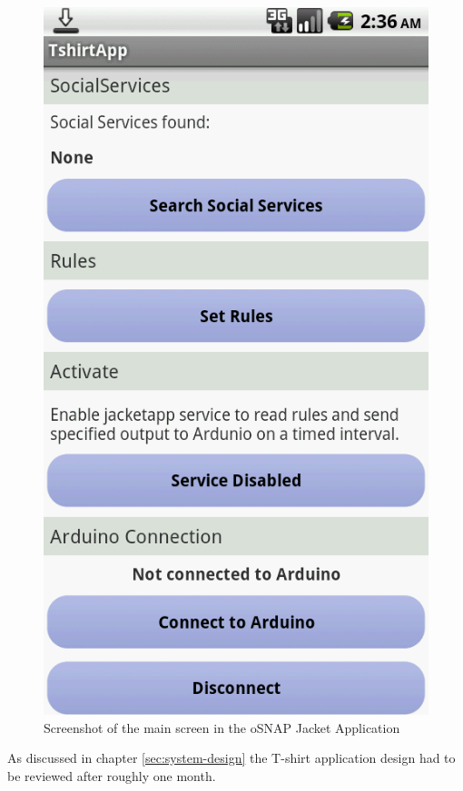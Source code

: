 \begin{figure}[H]
	\centering \includegraphics[scale=0.35]{img/jacketapp-overview}
	\caption{Screenshot of the main screen in the oSNAP Jacket Application}
	\label{fig:jacketapp-overview}
\end{figure}

As discussed in chapter \ref{sec:system-design} the T-shirt application design had to be reviewed after roughly one month.

